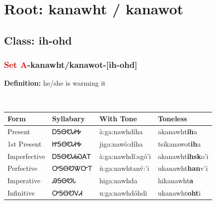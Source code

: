 \needspace{4in}
\section*{Root: kanawht / kanawot}
\nopagebreak
{}
\needspace{3in}
\subsection*{Class: ih-ohd}
\nopagebreak
\needspace{2in}
\subsubsection*{\textcolor{Red}{Set A}{-}\textbf{kanawht/kanawot}{-}[ih-ohd]}
\nopagebreak
\textbf{Definition: } he/she is warming it
\\[0.5em]
\begin{tabularx}{\textwidth}{l X X X}%
\toprule%
\textbf{Form}&\textbf{Syllabary}&\textbf{With Tone}&\textbf{Toneless}\\%
\midrule%
Present&ᎠᎦᎾᏬᏗᎭ&à:ga:nawhdíha&akanawht\textbf{ih}a\\%
1st Present&ᏥᎦᎾᏬᏗᎭ&jiga:nawò:díha&tsikanawot\textbf{ih}a\\%
Imperfective&ᎠᎦᎾᏬᏗᏍᎪᎢ&à:ga:nawhdǐ:sgó’i&akanawht\textbf{ihsk}o'i\\%
Perfective&ᎤᎦᎾᏬᏔᏅᎢ&ù:ga:nawhtanv́:’i&ukanawht\textbf{han}v'i\\%
Imperative&ᎯᎦᎾᏬᏓ&higa:nawhda&hikanawht\textbf{a}\\%
Infinitive&ᎤᎦᎾᏬᏙᏗ&u:ga:nawhdóhdi&ukanawht\textbf{oht}i\\%
\bottomrule%
\end{tabularx}
\\[1em]